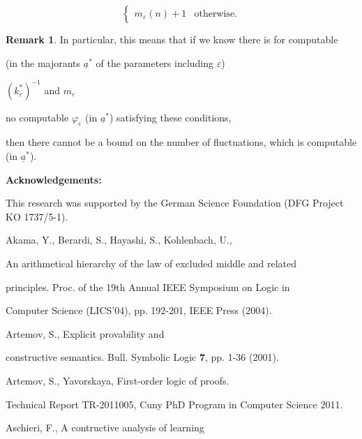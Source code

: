 \documentclass[1p]{elsarticle}
\newcommand{\tup}{\underline} %
\newcommand{\Telse}{\text{otherwise}}
\theoremstyle{plain}
\theoremstyle{definition}
\newtheorem{rmk}[thm]{Remark}
\theoremstyle{remark}
\renewenvironment{proof}[1][]{\noindent{\bf Proof{#1}. }}{\nopagebreak[4]{\hspace*{\fill}


  $\Box$              %

 }{\vspace{2ex}}}
\renewcommand{\phi}{\varphi}
\renewcommand{\epsilon}{\varepsilon}
\theoremstyle{definition}
\begin{document}
{\begin{proof}
\[\begin{cases}
m_\epsilon(n)+1&\Telse.

\end{cases}

\]

\end{proof}

\vspace*{-3mm}

\begin{rmk}

In particular, this means that if we know there is for computable 

(in the majorants $\underline{a}^*$ of the parameters including $\varepsilon$) 

$(k^*_{\varepsilon})^{-1}$ and $m_{\varepsilon}$ 

no computable $\phi_{\varepsilon}$ (in $\tup a^*$) satisfying these conditions,

then there cannot be a bound on the number of fluctuations, which is computable (in $\tup a^*$).

\end{rmk}





{\bf Acknowledgements:} 

This research was supported by the German Science Foundation (DFG Project KO 1737/5-1). 



\vspace*{-3mm}

\begin{thebibliography}{00}

 Akama, Y., Berardi, S., Hayashi, S., Kohlenbach, U., 

An arithmetical hierarchy of the law of excluded middle and related 

principles. Proc. of the 19th Annual IEEE Symposium on Logic in 

Computer Science (LICS'04), pp. 192-201, IEEE Press (2004).

 Artemov, S., Explicit provability and

constructive semantics. Bull. Symbolic Logic {\bf 7}, pp. 1-36 (2001).

 Artemov, S., Yavorskaya, First-order logic of proofs. 

Technical Report TR-2011005, Cuny PhD Program in Computer Science 2011.

 Aschieri, F., A contructive analysis of learning 


\end{thebibliography}}
\end{document}
